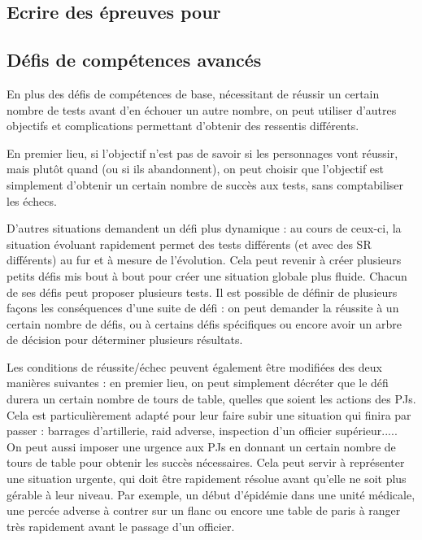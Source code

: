 \documentclass{report}
\begin{document}
\begin{multicols}{2}
\section{Ecrire des épreuves pour \diminutif}
\subsection{Défis de compétences avancés}
En plus des défis de compétences de base, nécessitant de réussir un certain nombre de tests avant d'en échouer un autre nombre, on peut utiliser d'autres objectifs et complications permettant d'obtenir des ressentis différents.

En premier lieu, si l'objectif n'est pas de savoir si les personnages vont réussir, mais plutôt quand (ou si ils abandonnent), on peut choisir que l'objectif est simplement d'obtenir un certain nombre de succès aux tests, sans comptabiliser les échecs. 

D'autres situations demandent un défi plus dynamique : au cours de ceux-ci, la situation évoluant rapidement permet des tests différents (et avec des SR différents) au fur et à mesure de l'évolution. Cela peut revenir à créer plusieurs petits défis mis bout à bout pour créer une situation globale plus fluide. Chacun de ses défis peut proposer plusieurs tests. Il est possible de définir de plusieurs façons les conséquences d'une suite de défi : on peut demander la réussite à un certain nombre de défis, ou à certains défis spécifiques ou encore avoir un arbre de décision pour déterminer plusieurs résultats.

Les conditions de réussite/échec peuvent également être modifiées des deux manières suivantes : en premier lieu, on peut simplement décréter que le défi durera un certain nombre de tours de table, quelles que soient les actions des PJs. Cela est particulièrement adapté pour leur faire subir une situation qui finira par passer : barrages d'artillerie, raid adverse, inspection d'un officier supérieur..... On peut aussi imposer une urgence aux PJs en donnant un certain nombre de tours de table pour obtenir les succès nécessaires. Cela peut servir à représenter une situation urgente, qui doit être rapidement résolue avant qu'elle ne soit plus gérable à leur niveau. Par exemple, un début d'épidémie dans une unité médicale, une percée adverse à contrer sur un flanc ou encore une table de paris à ranger très rapidement avant le passage d'un officier.


\end{multicols}
\end{document}
